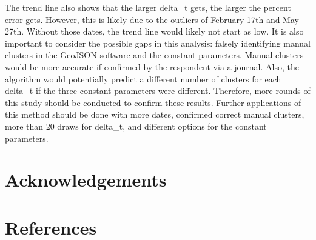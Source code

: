\documentclass[3p, authoryear]{elsarticle} %
\begin{document}
The trend line also shows that the larger delta\_t gets, the larger the percent error gets. However, this is likely due
to the outliers of February 17th and May 27th. Without those dates, the trend line would likely not start as low. It is
also important to consider the possible gaps in this analysis: falsely identifying manual clusters in the GeoJSON software and
the constant parameters. Manual clusters would be more accurate if confirmed by the respondent via a journal. Also,
the algorithm would potentially predict a different number of clusters for each delta\_t if the three
constant parameters were different. Therefore, more rounds of this study should be conducted to confirm these results. Further applications of this method should be done with more dates, confirmed correct manual clusters, more than 20 draws for delta\_t, and different options for the constant parameters.

\hypertarget{acknowledgements}{%
\section*{Acknowledgements}\label{acknowledgements}}

\hypertarget{references}{%
\section*{References}\label{references}}


\end{document}
